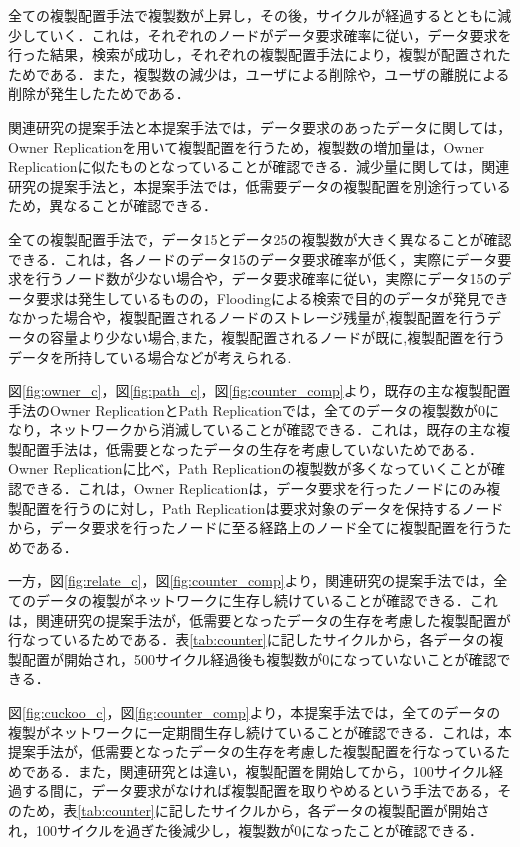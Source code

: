 \documentclass[11pt]{jreport}
\begin{document}
\newpage
\par 全ての複製配置手法で複製数が上昇し，その後，サイクルが経過するとともに減少していく．これは，それぞれのノードがデータ要求確率に従い，データ要求を行った結果，検索が成功し，それぞれの複製配置手法により，複製が配置されたためである．また，複製数の減少は，ユーザによる削除や，ユーザの離脱による削除が発生したためである．
\par 関連研究の提案手法と本提案手法では，データ要求のあったデータに関しては，Owner Replicationを用いて複製配置を行うため，複製数の増加量は，Owner Replicationに似たものとなっていることが確認できる．減少量に関しては，関連研究の提案手法と，本提案手法では，低需要データの複製配置を別途行っているため，異なることが確認できる．
\par 全ての複製配置手法で，データ15とデータ25の複製数が大きく異なることが確認できる．これは，各ノードのデータ15のデータ要求確率が低く，実際にデータ要求を行うノード数が少ない場合や，データ要求確率に従い，実際にデータ15のデータ要求は発生しているものの，Floodingによる検索で目的のデータが発見できなかった場合や，複製配置されるノードのストレージ残量が,複製配置を行うデータの容量より少ない場合,また，複製配置されるノードが既に,複製配置を行うデータを所持している場合などが考えられる.
\par 図\ref{fig:owner_c}，図\ref{fig:path_c}，図\ref{fig:counter_comp}より，既存の主な複製配置手法のOwner ReplicationとPath Replicationでは，全てのデータの複製数が0になり，ネットワークから消滅していることが確認できる．これは，既存の主な複製配置手法は，低需要となったデータの生存を考慮していないためである．
\\Owner Replicationに比べ，Path Replicationの複製数が多くなっていくことが確認できる．これは，Owner Replicationは，データ要求を行ったノードにのみ複製配置を行うのに対し，Path Replicationは要求対象のデータを保持するノードから，データ要求を行ったノードに至る経路上のノード全てに複製配置を行うためである．
\par 一方，図\ref{fig:relate_c}，図\ref{fig:counter_comp}より，関連研究の提案手法では，全てのデータの複製がネットワークに生存し続けていることが確認できる．これは，関連研究の提案手法が，低需要となったデータの生存を考慮した複製配置が行なっているためである．表\ref{tab:counter}に記したサイクルから，各データの複製配置が開始され，500サイクル経過後も複製数が0になっていないことが確認できる．
\par 図\ref{fig:cuckoo_c}，図\ref{fig:counter_comp}より，本提案手法では，全てのデータの複製がネットワークに一定期間生存し続けていることが確認できる．これは，本提案手法が，低需要となったデータの生存を考慮した複製配置を行なっているためである．また，関連研究とは違い，複製配置を開始してから，100サイクル経過する間に，データ要求がなければ複製配置を取りやめるという手法である，そのため，表\ref{tab:counter}に記したサイクルから，各データの複製配置が開始され，100サイクルを過ぎた後減少し，複製数が0になったことが確認できる．
\end{document}
